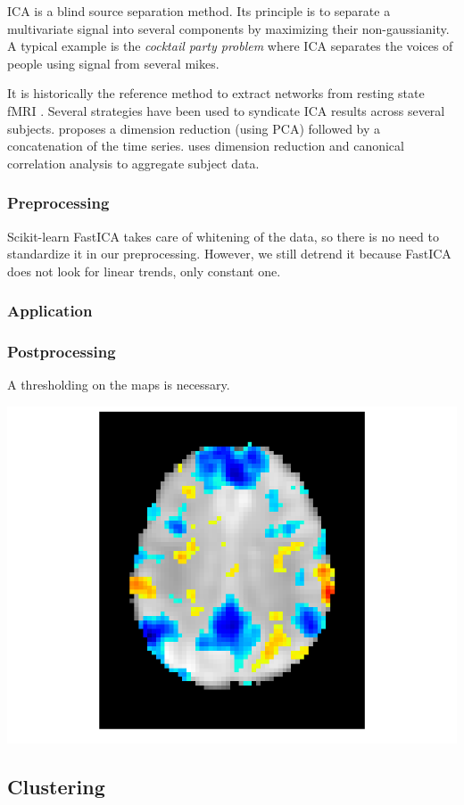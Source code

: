 \documentclass{frontiersSCNS} %
\begin{document}
ICA is a blind source separation method. Its principle is to separate a
multivariate signal into several components by maximizing their non-gaussianity.
A typical example is the \emph{cocktail party problem} where ICA separates the
voices of people using signal from several mikes.

It is historically the reference method to extract networks from resting state
fMRI \cite{biswal1999}. Several strategies have been used to syndicate ICA
results across several subjects. \cite{calhoun2001a} proposes a dimension
reduction (using PCA) followed by a concatenation of the time series.
\cite{varoquaux2010} uses dimension reduction and canonical correlation analysis
to aggregate subject data.

\subsubsection{Preprocessing}

Scikit-learn FastICA takes care of whitening of the data, so there is no need to
standardize it in our preprocessing. However, we still detrend it because
FastICA does not look for linear trends, only constant one.

\subsubsection{Application}


\subsubsection{Postprocessing}

A thresholding on the maps is necessary.


\includegraphics[width=.5\linewidth]{img/plot_canica_resting_state_17.png}

\subsection{Clustering}
\end{document}
